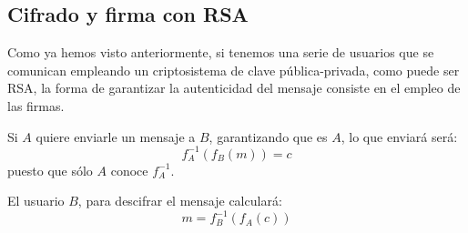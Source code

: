 \subsection{Cifrado y firma con RSA}

Como ya hemos visto anteriormente, si tenemos una serie de usuarios que se comunican empleando un criptosistema de clave pública-privada, como puede ser RSA, la forma de garantizar la autenticidad del mensaje consiste en el empleo de las firmas.

Si $A$ quiere enviarle un mensaje a $B$, garantizando que es $A$, lo que enviará será:
\[f_A^{-1}\left(f_B(m)\right) = c\]
puesto que sólo $A$ conoce $f^{-1}_A$.

El usuario $B$, para descifrar el mensaje calculará:
\[m = f_B^{-1}\left(f_A(c)\right)\]